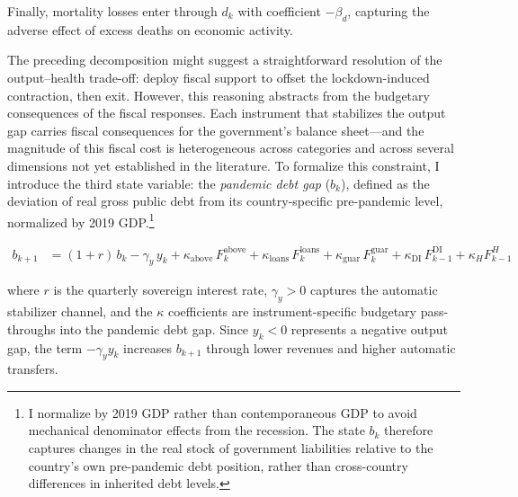 \documentclass[12pt, a4paper]{article}
\begin{document}
Finally, mortality losses enter through $d_k$ with coefficient $-\beta_d$, capturing the adverse effect of excess deaths on economic activity.

The preceding decomposition might suggest a straightforward resolution of the output--health trade-off: deploy fiscal support to offset the lockdown-induced contraction, then exit. However, this reasoning abstracts from the budgetary consequences of the fiscal responses. Each instrument that stabilizes the output gap carries fiscal consequences for the government's balance sheet---and the magnitude of this fiscal cost is heterogeneous across categories and across several dimensions not yet established in the literature. To formalize this constraint, I introduce the third state variable: the \textit{pandemic debt gap} (\(b_k\)), defined as the deviation of real gross public debt from its country-specific pre-pandemic level, normalized by 2019 GDP.\footnote{I normalize by 2019 GDP rather than contemporaneous GDP to avoid mechanical denominator effects from the recession. The state \(b_k\) therefore captures changes in the real stock of government liabilities relative to the country's own pre-pandemic debt position, rather than cross-country differences in inherited debt levels.}


\begin{equation}\label{eq:debt}
\begin{aligned}
b_{k+1} &= (1+r)\, b_k - \gamma_y\, y_k
        + \kappa_{\text{above}}\, F^{\text{above}}_k
        + \kappa_{\text{loans}}\, F^{\text{loans}}_k 
        +\kappa_{\text{guar}}\, F^{\text{guar}}_k
        + \kappa_{\text{DI}}\, F^{\text{DI}}_{k-1}
        +\kappa_H F^H_{k-1}
\end{aligned}
\end{equation}

\noindent where \(r\) is the quarterly sovereign interest rate, \(\gamma_y>0\) captures the automatic stabilizer channel, and the \(\kappa\) coefficients are instrument-specific budgetary pass-throughs into the pandemic debt gap. Since \(y_k<0\) represents a negative output gap, the term \(-\gamma_y y_k\) increases \(b_{k+1}\) through lower revenues and higher automatic transfers.
\end{document}
